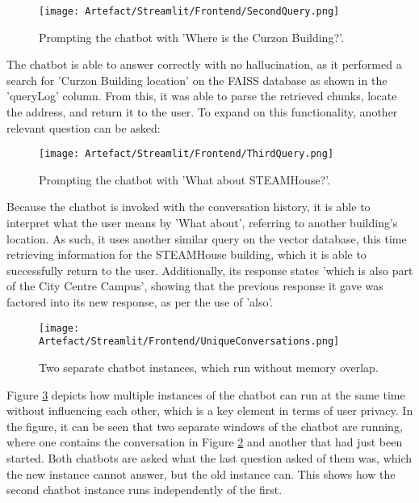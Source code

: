 \begin{figure}[H]
    \centering
    \texttt{[image: Artefact/Streamlit/Frontend/SecondQuery.png]}
    \caption{Prompting the chatbot with 'Where is the Curzon Building?'. \label{fig:SecondQuery}}
\end{figure}

\noindent The chatbot is able to answer correctly with no hallucination, as it performed a search for 'Curzon Building location' on the 
FAISS database as shown in the 'queryLog' column. From this, it was able to parse the retrieved chunks, locate the address, and return it to the
user. To expand on this functionality, another relevant question can be asked:

\begin{figure}[H]
    \centering
    \texttt{[image: Artefact/Streamlit/Frontend/ThirdQuery.png]}
    \caption{Prompting the chatbot with 'What about STEAMHouse?'. \label{fig:ThirdQuery}}
\end{figure}

\noindent Because the chatbot is invoked with the conversation history, it is able to interpret what the user means by 'What about', 
referring to another building's location. As such, it uses another similar query on the vector database, this time retrieving information 
for the STEAMHouse building, which it is able to successfully return to the user. Additionally, its response states 'which is also part of 
the City Centre Campus', showing that the previous response it gave was factored into its new response, as per the use of 'also'.

\begin{figure}[H]
    \centering
    \texttt{[image: Artefact/Streamlit/Frontend/UniqueConversations.png]}
    \caption{Two separate chatbot instances, which run without memory overlap. \label{fig:UniqueConversations}}
\end{figure}

\noindent Figure \ref{fig:UniqueConversations} depicts how multiple instances of the chatbot can run at the same time without influencing 
each other, which is a key element in terms of user privacy. In the figure, it can be seen that two separate windows of the chatbot are 
running, where one contains the conversation in Figure \ref{fig:ThirdQuery} and another that had just been started. Both chatbots are 
asked what the last question asked of them was, which the new instance cannot answer, but the old instance can. This shows how the second 
chatbot instance runs independently of the first.

